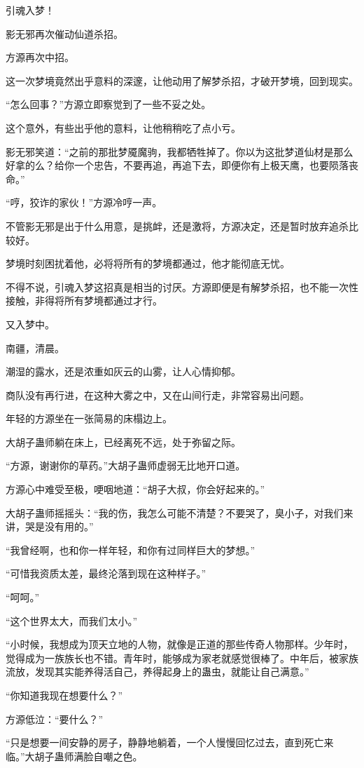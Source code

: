 \begin{this_body}
引魂入梦！

影无邪再次催动仙道杀招。

方源再次中招。

这一次梦境竟然出乎意料的深邃，让他动用了解梦杀招，才破开梦境，回到现实。

“怎么回事？”方源立即察觉到了一些不妥之处。

这个意外，有些出乎他的意料，让他稍稍吃了点小亏。

影无邪笑道：“之前的那批梦魇魔驹，我都牺牲掉了。你以为这批梦道仙材是那么好拿的么？给你一个忠告，不要再追，再追下去，即便你有上极天鹰，也要陨落丧命。”

“哼，狡诈的家伙！”方源冷哼一声。

不管影无邪是出于什么用意，是挑衅，还是激将，方源决定，还是暂时放弃追杀比较好。

梦境时刻困扰着他，必将将所有的梦境都通过，他才能彻底无忧。

不得不说，引魂入梦这招真是相当的讨厌。方源即便是有解梦杀招，也不能一次性接触，非得将所有梦境都通过才行。

又入梦中。

南疆，清晨。

潮湿的露水，还是浓重如灰云的山雾，让人心情抑郁。

商队没有再行进，在这种大雾之中，又在山间行走，非常容易出问题。

年轻的方源坐在一张简易的床榻边上。

大胡子蛊师躺在床上，已经离死不远，处于弥留之际。

“方源，谢谢你的草药。”大胡子蛊师虚弱无比地开口道。

方源心中难受至极，哽咽地道：“胡子大叔，你会好起来的。”

大胡子蛊师摇摇头：“我的伤，我怎么可能不清楚？不要哭了，臭小子，对我们来讲，哭是没有用的。”

“我曾经啊，也和你一样年轻，和你有过同样巨大的梦想。”

“可惜我资质太差，最终沦落到现在这种样子。”

“呵呵。”

“这个世界太大，而我们太小。”

“小时候，我想成为顶天立地的人物，就像是正道的那些传奇人物那样。少年时，觉得成为一族族长也不错。青年时，能够成为家老就感觉很棒了。中年后，被家族流放，发现其实能养得活自己，养得起身上的蛊虫，就能让自己满意。”

“你知道我现在想要什么？”

方源低泣：“要什么？”

“只是想要一间安静的房子，静静地躺着，一个人慢慢回忆过去，直到死亡来临。”大胡子蛊师满脸自嘲之色。


\end{this_body}
